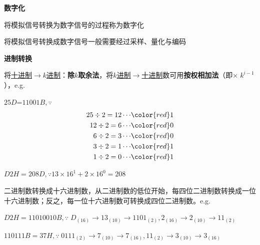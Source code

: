\begin{compactenum}[1.]
\item \textbf{数字化}
	\begin{compactitem}
	\item 将模拟信号转换为数字信号的过程称为数字化
	\item 将模拟信号转换成数字信号一般需要经过采样、量化与编码
	\end{compactitem}

\item \textbf{进制转换}
	\begin{compactitem}
	\item 将\underline{十进制$ \to k$进制}：\textbf{除$k$取余法}，将\underline{$k$进制$\to$十进制}数可用\textbf{按权相加法}（即$\times \; k^{i-1}$），e.g.
		\begin{compactitem}[\ding{86}]
		\item $25D$=$11001B, \because $
		\[ \begin{aligned} 25 \div 2=12\cdots & {\color{red}1} \\
		12 \div 2=6\cdots & {\color{red}0} \\
		6 \div 2=3\cdots & {\color{red}0} \\
		3 \div 2=1\cdots & {\color{red}1} \\
		1 \div 2=0\cdots & {\color{red}1}
		\end{aligned} \]
		\item $D2H=208D, \because 13\times 16^1 + 2 \times 16^0=208$
		\end{compactitem}
	
	\item 二进制数转换成十六进制数，从二进制数的低位开始，每四位二进制数转换成一位十六进制数；反之，每一位十六进制数可转换成四位二进制数。e.g.
		\begin{compactitem}[\ding{86}]
		\item $D2H = 11010010B, \because \; D_{(16)} \to 13_{(10)} \to 1101_{(2)}, 2_{(16)} \to 2_{(10)} \to 11_{(2)}$
		\item $110111B = 37H, \because \; 0111_{(2)} \to 7_{(10)} \to 7_{(16)}, 11_{(2)} \to 3_{(10)} \to 3_{(16)}$
		\end{compactitem}
	\end{compactitem}

\end{compactenum}%


